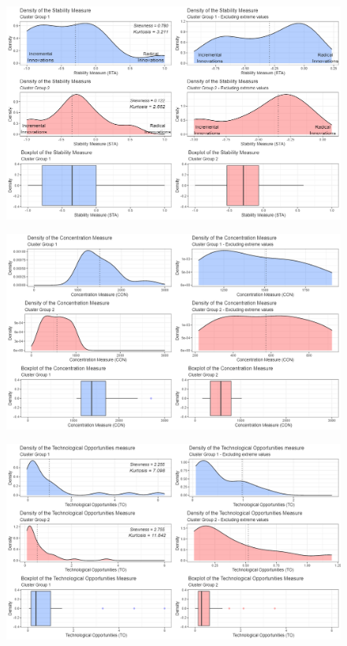 \documentclass{beamer}
\begin{document}
	\begin{frame}[allowframebreaks]
	\begin{figure}
		\centering
		\includegraphics[scale=0.30]{sta.png}
	\end{figure}
	\framebreak
	\begin{figure}
		\centering
		\includegraphics[scale=0.31]{pcon.png}
	\end{figure}
	\framebreak
	\begin{figure}
		\centering
		\includegraphics[scale=0.31 ]{to.png}
	\end{figure}
	\framebreak
	\end{frame}
\end{document}

